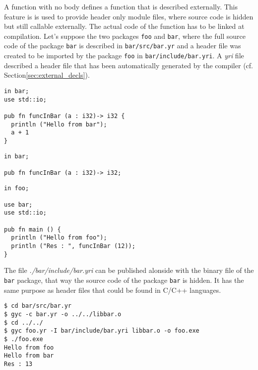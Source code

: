 A function with no body defines a function that is described externally. This
feature is is used to provide header only module files, where source code is
hidden but still callable externally. The actual code of the function has to be
linked at compilation. Let's suppose the two packages \texttt{foo} and
\texttt{bar}, where the full source code of the package \texttt{bar} is
described in \texttt{bar/src/bar.yr} and a header file was created to be
imported by the package \texttt{foo} in \texttt{bar/include/bar.yri}. A
\textit{yri} file described a header file that has been automatically generated
by the compiler (cf. Section\ref{sec:external_decls}).


\begin{lstlisting}[caption=\textit{./bar/src/bar.yr}, style=coloredverbatim]
in bar;
use std::io;

pub fn funcInBar (a : i32)-> i32 {
  println ("Hello from bar");
  a + 1
}
\end{lstlisting}

\begin{lstlisting}[caption=\textit{./bar/include/bar.yri}, style=coloredverbatim]
in bar;

pub fn funcInBar (a : i32)-> i32;
\end{lstlisting}
\begin{lstlisting}[caption=\textit{foo.yr}, style=coloredverbatim]
in foo;

use bar;
use std::io;

pub fn main () {
  println ("Hello from foo");
  println ("Res : ", funcInBar (12));
}
\end{lstlisting}


The file \textit{./bar/include/bar.yri} can be published alonside with the
binary file of the \texttt{bar} package, that way the source code of the package
\texttt{bar} is hidden. It has the same purpose as header files that could be
found in C/C++ languages.

\begin{lstlisting}[style=intermediateVerb]
$ cd bar/src/bar.yr
$ gyc -c bar.yr -o ../../libbar.o
$ cd ../../
$ gyc foo.yr -I bar/include/bar.yri libbar.o -o foo.exe
$ ./foo.exe
Hello from foo
Hello from bar
Res : 13
\end{lstlisting}

